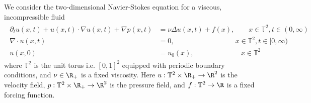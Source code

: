 We consider the two-dimensional Navier-Stokes equation for a viscous, incompressible fluid 
\begin{align}
\label{eq:navierstokes-velocity}
\begin{split}
\partial_t u(x,t) + u(x,t) \cdot \nabla u(x,t) + \nabla p(x,t) &= \nu \Delta u(x,t) + f(x), \qquad x \in \mathbb{T}^2, t \in (0,\infty)  \\
\nabla \cdot u(x,t) &= 0, \qquad \qquad \qquad \qquad \:\:\: x \in \mathbb{T}^2, t \in [0,\infty)  \\
u(x,0) &= u_0(x), \qquad \qquad \qquad \:\:\: x \in \mathbb{T}^2 
\end{split}
\end{align}
where \(\mathbb{T}^2\) is the unit torus i.e. \([0,1]^2\) equipped with periodic boundary conditions, and \(\nu \in \R_+\) is a fixed viscosity.
Here $u : \mathbb{T}^2 \times \R_+ \to \R^2$ is the velocity field,  
$p : \mathbb{T}^2 \times \R_+ \to \R^2$ is the pressure field, and
 \(f: \mathbb{T}^2 \to \R\) is a fixed forcing function.


